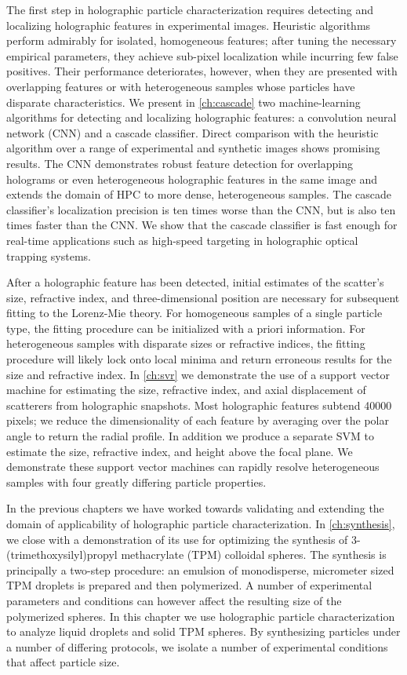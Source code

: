 The first step in holographic particle characterization
requires detecting and localizing holographic features in experimental
images. Heuristic algorithms perform admirably for isolated, homogeneous
features; after tuning the necessary empirical parameters, they achieve
sub-pixel localization while incurring few false positives. Their
performance deteriorates, however, when they are presented with overlapping features or
with heterogeneous samples whose particles have disparate characteristics.
We present in \autoref{ch:cascade} two machine-learning algorithms for
detecting and localizing holographic features: a convolution
neural network (CNN) and a cascade classifier. Direct comparison with the
heuristic algorithm over a range of experimental and synthetic images
shows promising results. The CNN demonstrates robust feature detection
for overlapping holograms or even heterogeneous holographic features
in the same image and extends the domain of HPC to more dense, heterogeneous
samples. The cascade classifier's localization precision
is ten times worse than the CNN, but is also ten times faster than
the CNN. We show that the cascade classifier is fast enough for real-time
applications such as high-speed targeting in holographic optical
trapping systems.

After a holographic feature has been detected, initial estimates of the
scatter's size, refractive index, and three-dimensional position
are necessary for subsequent fitting to the Lorenz-Mie theory.
For homogeneous samples of a single particle type, the fitting procedure
can be initialized with a priori information. For heterogeneous samples
with disparate sizes or refractive indices, the fitting procedure
will likely lock onto local minima and return erroneous results for
the size and refractive index.
In \autoref{ch:svr} we demonstrate the use of a support vector machine for
estimating the size, refractive index, and axial displacement of scatterers
from holographic snapshots. Most holographic features subtend \SI{40000}{} pixels;
we reduce the dimensionality of each feature by averaging over the polar
angle to return the radial profile. In addition we produce a separate SVM to
estimate the size, refractive index, and height above the focal plane.
We demonstrate these support vector machines can rapidly resolve heterogeneous
samples with four greatly differing particle properties.

In the previous chapters we have worked towards validating and extending
the domain of applicability of holographic particle characterization.
In \autoref{ch:synthesis}, we close with a demonstration of its use for
optimizing the synthesis of 3-(trimethoxysilyl)propyl methacrylate (TPM) colloidal
spheres. The synthesis is principally a two-step procedure: an emulsion of monodisperse,
micrometer sized TPM droplets is prepared and then polymerized.
A number of experimental parameters and conditions can however affect
the resulting size of the polymerized spheres. In this chapter we use
holographic particle characterization to analyze liquid droplets and
solid TPM spheres. By synthesizing particles under a number of
differing protocols, we isolate a number of experimental conditions
that affect particle size.
